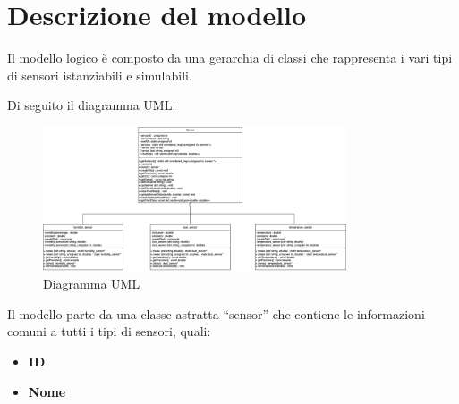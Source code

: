\documentclass{article}
\begin{document}
    \section{Descrizione del modello}
    Il modello logico è composto da una gerarchia di classi che rappresenta i vari tipi di sensori istanziabili e simulabili. 
        
    Di seguito il diagramma UML:    
    \begin{figure}[h!]
        \centering
        \includegraphics[width=0.8\textwidth]{UML.png}
        \caption*{Diagramma UML}
    \end{figure}
    
    \newpage
    \noindent Il modello parte da una classe astratta “sensor” che contiene le informazioni comuni a tutti i tipi di sensori, quali:
    \begin{itemize}
        \item \textbf{ID} 
        \item \textbf{Nome}
    \end{itemize} 
\end{document}
